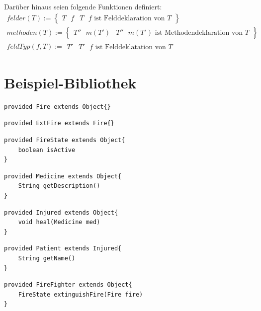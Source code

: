 \documentclass[a4paper,12pt]{article}
\begin{document}
Darüber hinaus seien folgende Funktionen definiert:
\begin{gather*}
\mathit{felder(T)} :=  \left\{ 
				\begin{array}{l|l}
					T \texttt{ }\mathit{f} & T \texttt{ }\mathit{f}\text{ ist Felddeklaration von }T
				\end{array}
              \right\}\\
\mathit{methoden(T)} := \left\{ 
				\begin{array}{l|l}
					T'' \text{ }m(T') & T'' \text{ }m(T') \text{ ist Methodendeklaration von }T
				\end{array}
              \right\}\\
\mathit{feldTyp(f,T)} := 
				\begin{array}{l|l}
					T' & T' \texttt{ }\mathit{f}\text{ ist Felddeklatation von }T
				\end{array}              
\end{gather*}

\section{Beispiel-Bibliothek}



\begin{lstlisting}[style = dsl]
provided Fire extends Object{}
\end{lstlisting}

\begin{lstlisting}[style = dsl]
provided ExtFire extends Fire{}
\end{lstlisting}


\begin{lstlisting}[style = dsl]
provided FireState extends Object{
	boolean isActive
}
\end{lstlisting}

\begin{lstlisting}[style = dsl]
provided Medicine extends Object{
	String getDescription()
}
\end{lstlisting}

\begin{lstlisting}[style = dsl]
provided Injured extends Object{
	void heal(Medicine med)	
}
\end{lstlisting}


\begin{lstlisting}[style = dsl]
provided Patient extends Injured{
	String getName()
}
\end{lstlisting}
\begin{lstlisting}[style = dsl]
provided FireFighter extends Object{
	FireState extinguishFire(Fire fire)
}
\end{lstlisting}
\end{document}
